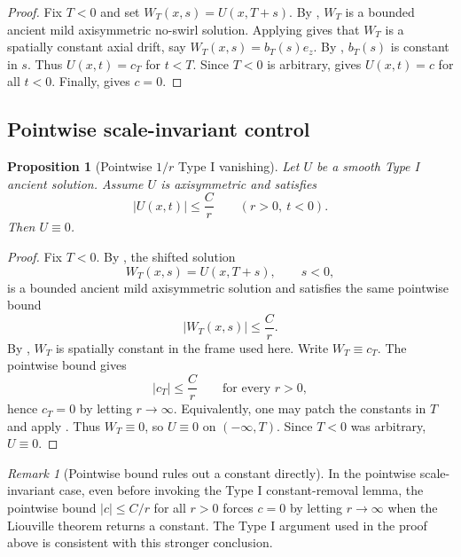 \documentclass[11pt]{amsart}
\theoremstyle{plain}
\newtheorem{proposition}[proposition]{Proposition}
\theoremstyle{definition}
\theoremstyle{remark}
\newtheorem{remark}[remark]{Remark}
\numberwithin{equation}{section}
\begin{document}
\begin{proof}
Fix \(T<0\) and set \(W_T(x,s)=U(x,T+s)\).  By ,
\(W_T\) is a bounded ancient mild axisymmetric no-swirl solution.  Applying
 gives that \(W_T\) is a spatially constant axial
drift, say \(W_T(x,s)=b_T(s)e_z\).  By
, \(b_T(s)\) is constant in \(s\).  Thus
\(U(x,t)=c_T\) for \(t<T\).  Since \(T<0\) is arbitrary,
 gives \(U(x,t)=c\) for all \(t<0\).  Finally,
 gives \(c=0\).
\end{proof}

\subsection{Pointwise scale-invariant control}

\begin{proposition}[Pointwise \(1/r\) Type I vanishing]\label{p3:prop:pointwise-typeI}
Let \(U\) be a smooth Type I ancient solution.  Assume \(U\) is axisymmetric
and satisfies
\[
   |U(x,t)|\le \frac{C}{r}
   \qquad(r>0,\ t<0).
\]
Then \(U\equiv0\).
\end{proposition}

\begin{proof}
Fix \(T<0\).  By , the shifted solution
\[
   W_T(x,s)=U(x,T+s),\qquad s<0,
\]
is a bounded ancient mild axisymmetric solution and satisfies the same
pointwise bound
\[
   |W_T(x,s)|\le \frac{C}{r}.
\]
By , \(W_T\) is spatially constant in the frame
used here.  Write \(W_T\equiv c_T\).  The pointwise bound gives
\[
   |c_T|\le \frac{C}{r}\qquad\text{for every }r>0,
\]
hence \(c_T=0\) by letting \(r\to\infty\).  Equivalently, one may patch the
constants in \(T\) and apply .  Thus
\(W_T\equiv0\), so \(U\equiv0\) on \(( -\infty,T)\).  Since \(T<0\) was
arbitrary, \(U\equiv0\).
\end{proof}

\begin{remark}[Pointwise bound rules out a constant directly]
\label{p3:rem:pointwise-r-infty}
In the pointwise scale-invariant case, even before invoking the Type I
constant-removal lemma, the pointwise bound \(|c|\le C/r\) for all \(r>0\)
forces \(c=0\) by letting \(r\to\infty\) when the Liouville theorem returns
a constant.  The Type I argument used in the proof above is consistent with
this stronger conclusion.
\end{remark}
\end{document}
